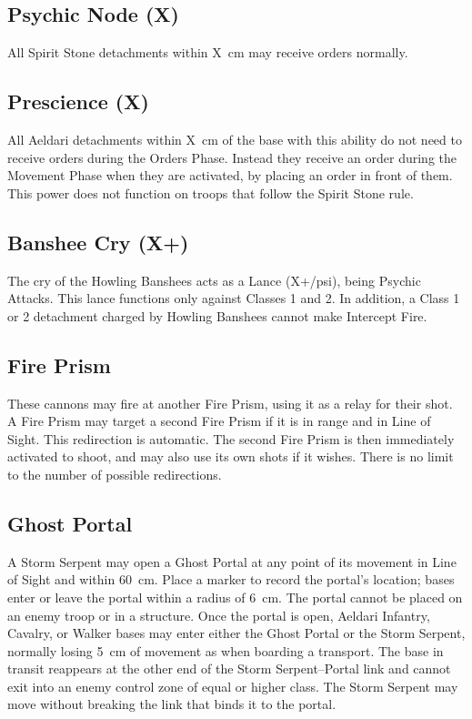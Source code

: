 \subsection{Psychic Node (X)}

All Spirit Stone detachments within X~cm may receive orders normally.

\subsection{Prescience (X)}

All Aeldari detachments within X~cm of the base with this ability do not need to receive orders during the Orders Phase. Instead they receive an order during the Movement Phase when they are activated, by placing an order in front of them. This power does not function on troops that follow the Spirit Stone rule.

\subsection{Banshee Cry (X+)}

The cry of the Howling Banshees acts as a Lance (X+/psi), being Psychic Attacks. This lance functions only against Classes 1 and 2. In addition, a Class 1 or 2 detachment charged by Howling Banshees cannot make Intercept Fire.

\subsection{Fire Prism}

These cannons may fire at another Fire Prism, using it as a relay for their shot. A Fire Prism may target a second Fire Prism if it is in range and in Line of Sight. This redirection is automatic. The second Fire Prism is then immediately activated to shoot, and may also use its own shots if it wishes. There is no limit to the number of possible redirections.

\subsection{Ghost Portal}

A Storm Serpent may open a Ghost Portal at any point of its movement in Line of Sight and within 60~cm. Place a marker to record the portal's location; bases enter or leave the portal within a radius of 6~cm. The portal cannot be placed on an enemy troop or in a structure. Once the portal is open, Aeldari Infantry, Cavalry, or Walker bases may enter either the Ghost Portal or the Storm Serpent, normally losing 5~cm of movement as when boarding a transport. The base in transit reappears at the other end of the Storm Serpent--Portal link and cannot exit into an enemy control zone of equal or higher class. The Storm Serpent may move without breaking the link that binds it to the portal.

